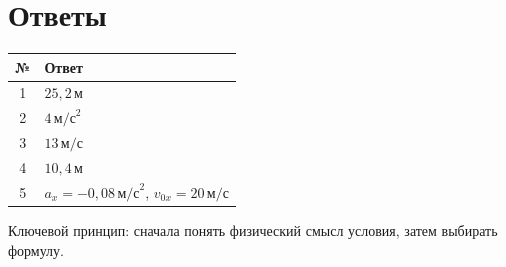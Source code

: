 \documentclass[a4paper,12pt]{article}
\newcommand{\ms}{\,\text{м/с}}
\newcommand{\mss}{\,\text{м/с}^2}
\begin{document}
\clearpage

\section*{Ответы}

\begin{center}

\begin{tabularx}{0.88\linewidth}{
  @{}
  c
  X
  @{}
}

\toprule

\textbf{№}
&
\textbf{Ответ}
\\

\midrule

1
&
$25{,}2\,\text{м}$
\\

2
&
$4\mss$
\\

3
&
$13\ms$
\\

4
&
$10{,}4\,\text{м}$
\\

5
&
$a_x=-0{,}08\mss$,
\qquad
$v_{0x}=20\ms$
\\

\bottomrule

\end{tabularx}

\end{center}

\vfill

\begin{center}
\small
\textcolor{darkaccent}{
Ключевой принцип:
сначала понять физический смысл условия,
затем выбирать формулу.
}
\end{center}
\end{document}
